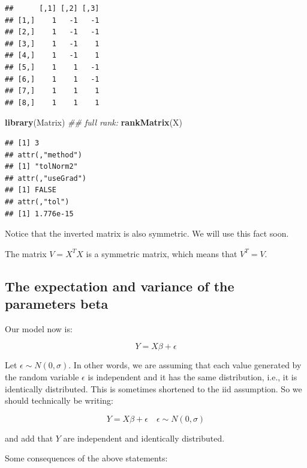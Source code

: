 \documentclass[12pt,]{krantz}
\newenvironment{Shaded}{\begin{snugshade}}{\end{snugshade}}
\newcommand{\CommentTok}[1]{\textcolor[rgb]{0.56,0.35,0.01}{\textit{#1}}}
\newcommand{\KeywordTok}[1]{\textcolor[rgb]{0.13,0.29,0.53}{\textbf{#1}}}
\newcommand{\NormalTok}[1]{#1}
\begin{document}
\begin{verbatim}
##      [,1] [,2] [,3]
## [1,]    1   -1   -1
## [2,]    1   -1   -1
## [3,]    1   -1    1
## [4,]    1   -1    1
## [5,]    1    1   -1
## [6,]    1    1   -1
## [7,]    1    1    1
## [8,]    1    1    1
\end{verbatim}

\begin{Shaded}
\begin{Highlighting}[]
\KeywordTok{library}\NormalTok{(Matrix)}
\CommentTok{## full rank:}
\KeywordTok{rankMatrix}\NormalTok{(X)}
\end{Highlighting}
\end{Shaded}

\begin{verbatim}
## [1] 3
## attr(,"method")
## [1] "tolNorm2"
## attr(,"useGrad")
## [1] FALSE
## attr(,"tol")
## [1] 1.776e-15
\end{verbatim}

Notice that the inverted matrix is also symmetric. We will use this fact soon.

The matrix \(V=X^T X\) is a symmetric matrix, which means that \(V^T=V\).

\hypertarget{the-expectation-and-variance-of-the-parameters-beta}{%
\subsection{The expectation and variance of the parameters beta}\label{the-expectation-and-variance-of-the-parameters-beta}}

Our model now is:

\begin{equation}
Y = X\beta + \epsilon
\end{equation}

Let \(\epsilon\sim N(0,\sigma)\). In other words, we are assuming that each value generated by the random variable \(\epsilon\) is independent and it has the same distribution, i.e., it is identically distributed. This is sometimes shortened to the iid assumption. So we should technically be writing:

\begin{equation}
Y = X\beta + \epsilon \quad  \epsilon\sim N(0,\sigma)
\end{equation}

and add that \(Y\) are independent and identically distributed.

Some consequences of the above statements:
\end{document}
